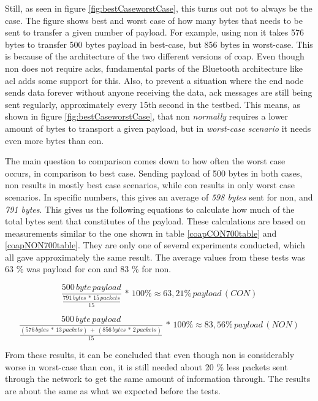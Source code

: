 \noindent Still, as seen in figure \ref{fig:bestCaseworstCase}, this turns out not to always be the case. The figure shows best and worst case of how many bytes that needs to be sent to transfer a given number of \gls{payload}. For example, using \gls{non} it takes 576 bytes to transfer 500 bytes payload in best-case, but 856 bytes in worst-case. This is because of the architecture of the two different versions of \gls{coap}. Even though \gls{non} does not require \glspl{ack}, fundamental parts of the Bluetooth architecture like \gls{acl} adds some support for this. Also, to prevent a situation where the end node sends data forever without anyone receiving the data, \gls{ack} messages are still being sent regularly, approximately every 15th second in the testbed. This means, as shown in figure \ref{fig:bestCaseworstCase}, that \gls{non} \textit{normally} requires a lower amount of bytes to transport a given \gls{payload}, but in \textit{worst-case scenario} it needs even more bytes than \gls{con}. 

\noindent The main question to comparison comes down to how often the worst case occurs, in comparison to best case. Sending \gls{payload} of 500 bytes in both cases, \gls{non} results in mostly best case scenarios, while \gls{con} results in only worst case scenarios. In specific numbers, this gives an average of \textit{598 bytes} sent for \gls{non}, and \textit{791 bytes}. This gives us the following equations to calculate how much of the total bytes sent that constitutes of the \gls{payload}. These calculations are based on measurements similar to the one shown in table \ref{coapCON700table} and \ref{coapNON700table}. They are only one of several experiments conducted, which all gave approximately the same result.  The average values from these tests was 63 \% was \gls{payload} for \gls{con} and 83 \% for \gls{non}. 


\begin{equation} \label{bestWorstEquation}
	\frac{500 \, byte \, payload}{\frac{791 \, bytes \,*\, 15 \, packets}{15}}\,*\,100 \% \approx 63,21 \%\, payload \, (CON)
\end{equation}

\begin{equation} \label{bestWorstEquation2}
\frac{500\, byte\, payload}{\frac{(576\, bytes\, *\, 13\, packets)\,+\,(856\, bytes\, *\, 2 \,packets)}{15}}\,*\,100 \% \approx 83,56 \%\, payload \, (NON)
\end{equation}

\noindent From these results, it can be concluded that even though \gls{non} is considerably worse in worst-case than \gls{con}, it is still needed about 20 \% less packets sent through the network to get the same amount of information through. The results are about the same as what we expected before the tests. 



